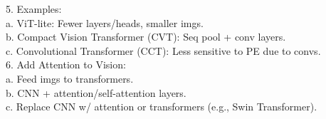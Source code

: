 5. Examples: \\
   a. ViT-lite: Fewer layers/heads, smaller imgs. \\
   b. Compact Vision Transformer (CVT): Seq pool + conv layers. \\
   c. Convolutional Transformer (CCT): Less sensitive to PE due to convs. \\

6. Add Attention to Vision: \\
   a. Feed imgs to transformers. \\
   b. CNN + attention/self-attention layers. \\
   c. Replace CNN w/ attention or transformers (e.g., Swin Transformer). \\